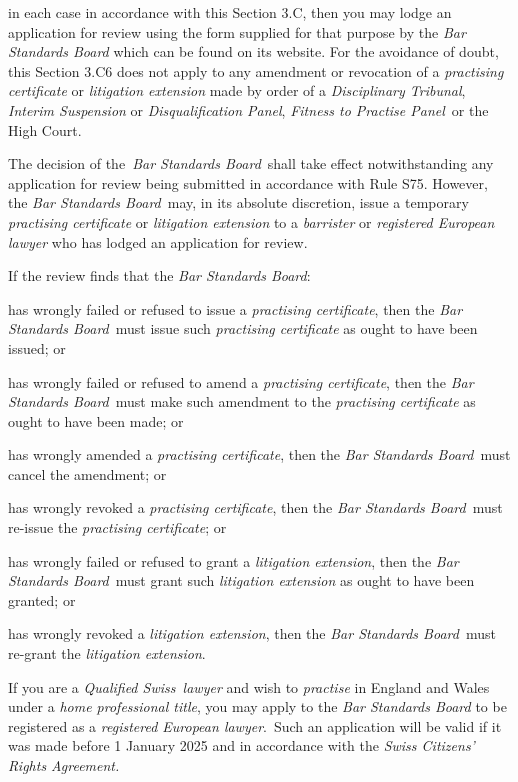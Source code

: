 in each case in accordance with this Section 3.C, then you may lodge an
application for review using the form supplied for that purpose by the
\emph{Bar Standards Board} which can be found on its website. For the
avoidance of doubt, this Section 3.C6 does not apply to any amendment or
revocation of a \emph{practising certificate} or \emph{litigation
extension} made by order of a \emph{Disciplinary Tribunal},
\emph{Interim Suspension} or \emph{Disqualification Panel},
\emph{Fitness to Practise Panel}~or the High Court.


The decision of the~\emph{Bar Standards Board}~shall take effect
notwithstanding any application for review being submitted in accordance
with Rule S75. However, the \emph{Bar Standards Board}~may, in its
absolute discretion, issue a temporary \emph{practising certificate} or
\emph{litigation extension} to a \emph{barrister} or \emph{registered
European lawyer} who has lodged an application for review.
\ln
{}

If the review finds that the \emph{Bar Standards Board}:\nl\item has wrongly failed or refused to issue a \emph{practising
certificate}, then the \emph{Bar Standards Board}~must issue such
\emph{practising certificate} as ought to have been issued; or
\item has wrongly failed or refused to amend a \emph{practising
certificate}, then the \emph{Bar Standards Board}~must make such
amendment to the \emph{practising certificate} as ought to have been
made; or
\item has wrongly amended a \emph{practising certificate}, then the
\emph{Bar Standards Board}~must cancel the amendment; or
\item has wrongly revoked a \emph{practising certificate}, then the
\emph{Bar Standards Board}~must re-issue the \emph{practising
certificate}; or
\item has wrongly failed or refused to grant a \emph{litigation extension},
then the \emph{Bar Standards Board}~must grant such \emph{litigation
extension} as ought to have been granted; or
\item has wrongly revoked a \emph{litigation extension}, then the \emph{Bar
Standards Board}~must re-grant the \emph{litigation extension}.
\ln
{}



If you are a \emph{Qualified Swiss~lawyer} and wish to \emph{practise}
in England and Wales under a \emph{home professional title}, you may
apply to the \emph{Bar Standards Board} to be registered as a
\emph{registered European lawyer}.~Such an application will be valid if
it was made before 1 January 2025 and in accordance with the \emph{Swiss
Citizens' Rights Agreement.}

